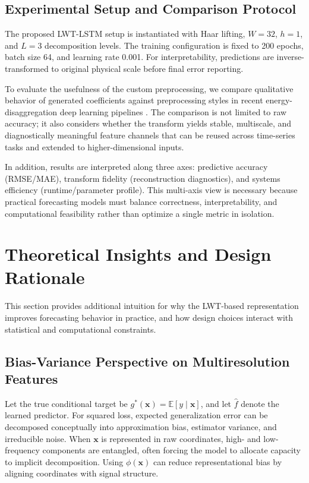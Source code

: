 \documentclass[journal]{IEEEtran}
\begin{document}
\subsection{Experimental Setup and Comparison Protocol}
The proposed LWT-LSTM setup is instantiated with Haar lifting, $W=32$, $h=1$, and $L=3$ decomposition levels. The training configuration is fixed to 200 epochs, batch size 64, and learning rate 0.001. For interpretability, predictions are inverse-transformed to original physical scale before final error reporting.

To evaluate the usefulness of the custom preprocessing, we compare qualitative behavior of generated coefficients against preprocessing styles in recent energy-disaggregation deep learning pipelines \cite{ylla2024nilm,yllaRepo}. The comparison is not limited to raw accuracy; it also considers whether the transform yields stable, multiscale, and diagnostically meaningful feature channels that can be reused across time-series tasks and extended to higher-dimensional inputs.

In addition, results are interpreted along three axes: predictive accuracy (RMSE/MAE), transform fidelity (reconstruction diagnostics), and systems efficiency (runtime/parameter profile). This multi-axis view is necessary because practical forecasting models must balance correctness, interpretability, and computational feasibility rather than optimize a single metric in isolation.

\section{Theoretical Insights and Design Rationale}

This section provides additional intuition for why the LWT-based representation improves forecasting behavior in practice, and how design choices interact with statistical and computational constraints.

\subsection{Bias-Variance Perspective on Multiresolution Features}
Let the true conditional target be $g^*(\mathbf{x})=\mathbb{E}[y\mid\mathbf{x}]$, and let $\hat{f}$ denote the learned predictor. For squared loss, expected generalization error can be decomposed conceptually into approximation bias, estimator variance, and irreducible noise. When $\mathbf{x}$ is represented in raw coordinates, high- and low-frequency components are entangled, often forcing the model to allocate capacity to implicit decomposition. Using $\phi(\mathbf{x})$ can reduce representational bias by aligning coordinates with signal structure.
\end{document}
